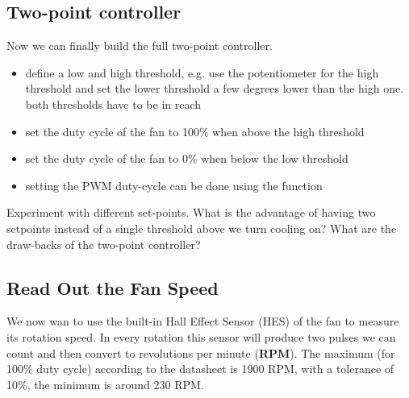 \subsection{Two-point controller}\label{sec:cool2}
Now we can finally build the full two-point controller.
\begin{itemize}
    \item define a low and high threshold, e.g. use the potentiometer for the high threshold and set the lower threshold a few degrees lower than the high one. both thresholds have to be in reach
	\item set the duty cycle of the fan to 100\% when above the high threshold
	\item set the duty cycle of the fan to 0\% when below the low threshold
	\item setting the PWM duty-cycle can be done using the  function
\end{itemize}
Experiment with different set-points. What is the advantage of having two setpoints instead of a single threshold above we turn cooling on? What are the draw-backs of the two-point controller?

\vspace{0.5cm}
\begin{center}
\end{center}

\subsection{Read Out the Fan Speed}
We now wan to use the built-in Hall Effect Sensor (HES) of the fan to measure its rotation speed. In every rotation this sensor will produce two pulses we can count and then convert to revolutions per minute (\textbf{RPM}). The maximum (for 100\% duty cycle) according to the datasheet is 1900 RPM, with a tolerance of 10\%, the minimum is around 230 RPM.

